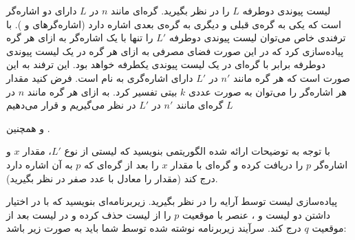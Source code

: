 

 لیست پیوندی دوطرفه {$L$} را در نظر بگیرید. گره‌ای مانند {$n$} در {$L$} دارای دو اشاره‌گر است که یکی به گره‌ی قبلی و دیگری به گره‌ی بعدی اشاره دارد (اشاره‌گرهای {} و {}). با ترفندی خاص می‌توان لیست پیوندی دوطرفه {$L'$} را تنها با یک اشاره‌گر به ازای هر گره پیاده‌سازی کرد که در این صورت فضای مصرفی به ازای هر گره در یک لیست پیوندی دوطرفه برابر با گره‌ای در یک لیست پیوندی یکطرفه خواهد بود. این ترفند به این صورت است که هر گره مانند {$n'$} در {$L'$} دارای اشاره‌گری به نام {} است. فرض کنید مقدار هر اشاره‌گر را می‌توان به صورت عددی {$k$} بیتی تفسیر کرد. به ازای هر گره مانند {$n$} در {$L$} گره‌ای مانند {$n'$} در {$L'$} در نظر می‌گیریم و قرار می‌دهیم { و همچنین 
{}.

با توجه به توضیحات ارائه شده الگوریتمی بنویسید که لیستی از نوع {$L'$}، مقدار {$x$} و اشاره‌گر {$p$} را دریافت کرده و گره‌ای با مقدار {$x$} را بعد از گره‌ای که {$p$} به آن اشاره دارد درج کند (مقدار {} را معادل با عدد صفر در نظر بگیرید).



 پیاده‌سازی لیست توسط آرایه را در نظر بگیرید. زیربرنامه‌ای بنویسید که با در اختیار داشتن دو لیست {} و {}، عنصر با موقعیت {$p$} را از لیست {} حذف کرده و در لیست {} بعد از موقعیت {$q$} درج کند. سرآیند زیربرنامه نوشته شده  توسط شما باید به صورت زیر باشد:
\begin{latin}
\begin{algorithmic}[1]
\Statex	{}
\end{algorithmic}
\end{latin}


}
